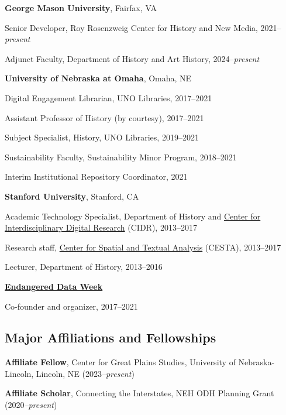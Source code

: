 \documentclass[10pt]{article}
\begin{document}
\textbf{George Mason University}, Fairfax, VA

\quad Senior Developer, Roy Rosenzweig Center for History and New Media, 2021--\textit{present}

\quad Adjunct Faculty, Department of History and Art History, 2024--\textit{present}

\vspace{.4cm}

\textbf{University of Nebraska at Omaha}, Omaha, NE

\quad Digital Engagement Librarian, UNO Libraries, 2017--2021

\quad Assistant Professor of History (by courtesy), 2017--2021

\quad Subject Specialist, History, UNO Libraries, 2019--2021

\quad Sustainability Faculty, Sustainability Minor Program, 2018--2021

\quad Interim Institutional Repository Coordinator, 2021

\vspace{.4cm}

\textbf{Stanford University}, Stanford, CA

\quad Academic Technology Specialist, Department of History and \href{http://cidr.stanford.edu}{Center for Interdisciplinary Digital Research} (CIDR), 2013--2017

\quad Research staff, \href{http://cesta.stanford.edu}{Center for Spatial and Textual Analysis} (CESTA), 2013--2017

\quad Lecturer, Department of History, 2013--2016

\vspace{.4cm}

\textbf{\href{https://endangereddataweek.org}{Endangered Data Week}}

\quad Co-founder and organizer, 2017--2021

\vspace{0.2cm}

\subsection*{Major Affiliations and Fellowships}

\textbf{Affiliate Fellow}, Center for Great Plains Studies, University of Nebraska-Lincoln, Lincoln, NE (2023--\textit{present})

\textbf{Affiliate Scholar}, Connecting the Interstates, NEH ODH Planning Grant (2020--\textit{present})
\end{document}
